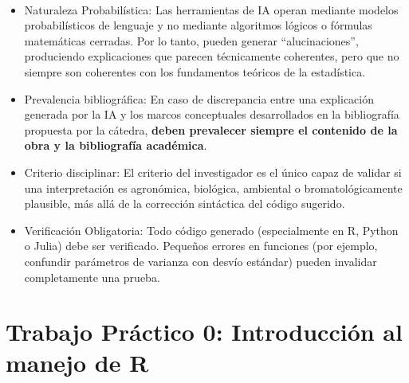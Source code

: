 \documentclass[
  spanish,
  letterpaper,
  DIV=11,
  numbers=noendperiod]{scrreprt}
\providecommand{\tightlist}{%
  \setlength{\itemsep}{0pt}\setlength{\parskip}{0pt}}
\begin{document}
~

\begin{tcolorbox}[enhanced jigsaw, arc=.35mm, bottomrule=.15mm, bottomtitle=1mm, breakable, colback=white, colbacktitle=quarto-callout-warning-color!10!white, colframe=quarto-callout-warning-color-frame, coltitle=black, left=2mm, leftrule=.75mm, opacityback=0, opacitybacktitle=0.6, rightrule=.15mm, title=\textcolor{quarto-callout-warning-color}{\faExclamationTriangle}\hspace{0.5em}{Criterios de precaución y verificación obligatoria}, titlerule=0mm, toprule=.15mm, toptitle=1mm]

\begin{itemize}
\tightlist
\item
  Naturaleza Probabilística: Las herramientas de IA operan mediante
  modelos probabilísticos de lenguaje y no mediante algoritmos lógicos o
  fórmulas matemáticas cerradas. Por lo tanto, pueden generar
  ``alucinaciones'', produciendo explicaciones que parecen técnicamente
  coherentes, pero que no siempre son coherentes con los fundamentos
  teóricos de la estadística.
\item
  Prevalencia bibliográfica: En caso de discrepancia entre una
  explicación generada por la IA y los marcos conceptuales desarrollados
  en la bibliografía propuesta por la cátedra, \textbf{deben prevalecer
  siempre el contenido de la obra y la bibliografía académica}.
\item
  Criterio disciplinar: El criterio del investigador es el único capaz
  de validar si una interpretación es agronómica, biológica, ambiental o
  bromatológicamente plausible, más allá de la corrección sintáctica del
  código sugerido.
\item
  Verificación Obligatoria: Todo código generado (especialmente en R,
  Python o Julia) debe ser verificado. Pequeños errores en funciones
  (por ejemplo, confundir parámetros de varianza con desvío estándar)
  pueden invalidar completamente una prueba.
\end{itemize}

\end{tcolorbox}


\chapter{Trabajo Práctico 0: Introducción al manejo de
R}\label{trabajo-pruxe1ctico-0-introducciuxf3n-al-manejo-de-r}
\end{document}
